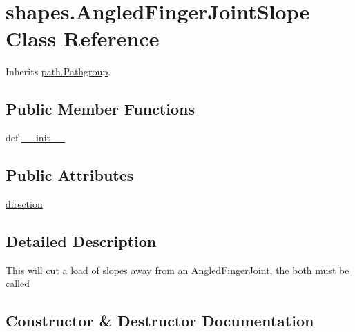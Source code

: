 \hypertarget{classshapes_1_1_angled_finger_joint_slope}{}\section{shapes.\+Angled\+Finger\+Joint\+Slope Class Reference}
\label{classshapes_1_1_angled_finger_joint_slope}


Inherits \hyperlink{classpath_1_1_pathgroup}{path.\+Pathgroup}.

\subsection*{Public Member Functions}
\begin{DoxyCompactItemize}
\item 
def \hyperlink{classshapes_1_1_angled_finger_joint_slope_a4a2338c3c3171a3e6aa98991ecc7f0de}{\+\_\+\+\_\+init\+\_\+\+\_\+}
\end{DoxyCompactItemize}
\subsection*{Public Attributes}
\begin{DoxyCompactItemize}
\item 
\hyperlink{classshapes_1_1_angled_finger_joint_slope_aec9e488a6e295ae2ccee1d23a1d21a88}{direction}
\end{DoxyCompactItemize}


\subsection{Detailed Description}
\begin{DoxyVerb}This will cut a load of slopes away from an AngledFingerJoint, the both must be called\end{DoxyVerb}
 

\subsection{Constructor \& Destructor Documentation}
\hypertarget{classshapes_1_1_angled_finger_joint_slope_a4a2338c3c3171a3e6aa98991ecc7f0de}{}
